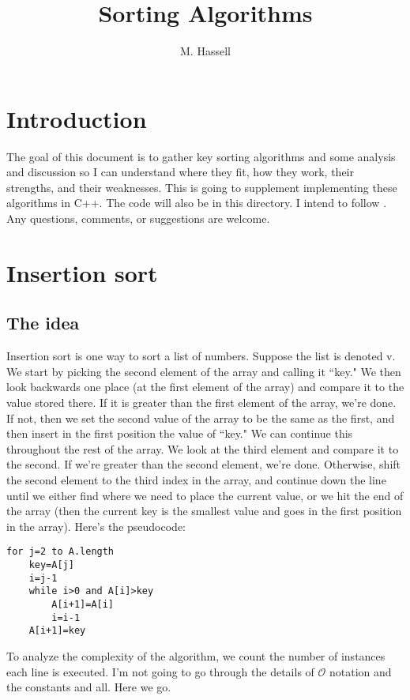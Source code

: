 \documentclass[12pt,english]{article}
\title{Sorting Algorithms}
\author{M. Hassell}
\begin{document}
\maketitle

\section{Introduction}

The goal of this document is to gather key sorting algorithms and some analysis and discussion so I can understand where they fit, how they work, their strengths, and their weaknesses.  This is going to supplement implementing these algorithms in C++.  The code will also be in this directory.  I intend to follow \cite{CoStRiLe:2001}. Any questions, comments, or suggestions are welcome.

\section{Insertion sort}

\subsection{The idea}

Insertion sort is one way to sort a list of numbers.  Suppose the list is denoted v.   We start by picking the second element of the array and calling it ``key."  We then look backwards one place (at the first element of the array) and compare it to the value stored there.  If it is greater than the first element of the array, we're done.  If not, then we set the second value of the array to be the same as the first, and then insert in the first position the value of ``key."   We can continue this throughout the rest of the array.  We look at the third element and compare it to the second.  If we're greater than the second element, we're done.  Otherwise, shift the second element to the third index in the array, and continue down the line until we either find where we need to place the current value, or we hit the end of the array (then the current key is the smallest value and goes in the first position in the array).  Here's the pseudocode:

\begin{lstlisting}
for j=2 to A.length
	key=A[j]
	i=j-1
	while i>0 and A[i]>key
		A[i+1]=A[i]
		i=i-1
	A[i+1]=key
\end{lstlisting}

To analyze the complexity of the algorithm, we count the number of instances each line is executed.  I'm not going to go through the details of $\mathcal{O}$ notation and the constants and all.  Here we go.
\end{document}
